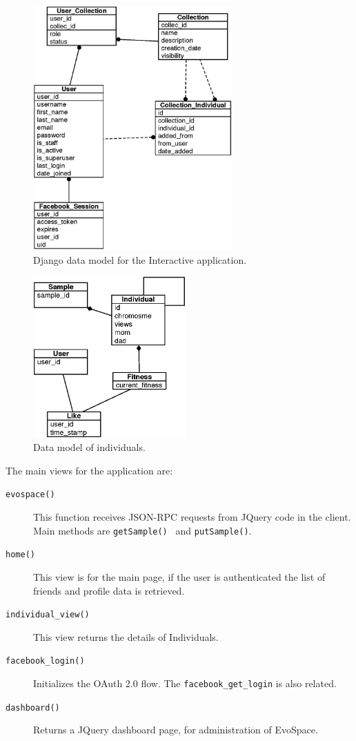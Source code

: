 \documentclass{sig-alternate}
\begin{document}
\begin{figure}[!t]
    \centering
        \includegraphics[width=3in]{datamodel.eps}
    \caption{Django data model for the Interactive application.}
    \label{datamodel}
\end{figure}

\begin{figure}[!t]
    \centering
        \includegraphics[width=2.3in]{redisModel.eps}
    \caption{Data model of individuals.}
    \label{redisModel}
\end{figure}

The main views for the application are:

\begin{description}

\item[\texttt{evospace()}] This function receives JSON-RPC requests from JQuery code in the client. Main methods are \texttt{getSample() } and \texttt{putSample()}.
\item[\texttt{home()}] This view is for the main page, if the user is authenticated the list of friends and profile data is retrieved.
\item [\texttt{individual\_view()}] This view returns the details of Individuals.
\item [\texttt{facebook\_login()}] Initializes the OAuth 2.0 flow. The \texttt{facebook\_get\_login} is also related.
\item [\texttt{dashboard()}] Returns a JQuery dashboard page, for administration of EvoSpace.
\end{description}
\end{document}
